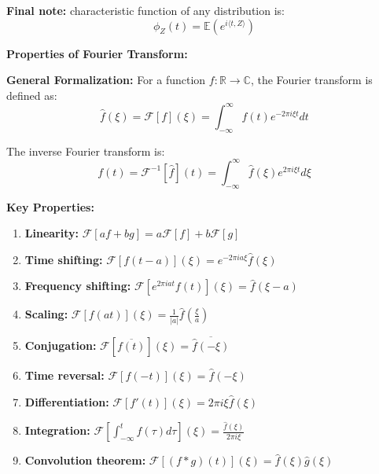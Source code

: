 \documentclass[a4paper, 12pt]{article}
\begin{document}
\begin{answerenum}
        \item \textbf{Final note:} characteristic function of any distribution is:
            \[ \phi_Z(t) = \mathbb{E}(e^{i\langle t,Z\rangle}) \]
            
            \textbf{Properties of Fourier Transform:}

            \textbf{General Formalization:}
            For a function $f: \mathbb{R} \to \mathbb{C}$, the Fourier transform is defined as:
            \[ \hat{f}(\xi) = \mathcal{F}[f](\xi) = \int_{-\infty}^{\infty} f(t) e^{-2\pi i \xi t} dt \]

            The inverse Fourier transform is:
            \[ f(t) = \mathcal{F}^{-1}[\hat{f}](t) = \int_{-\infty}^{\infty} \hat{f}(\xi) e^{2\pi i \xi t} d\xi \]

            \textbf{Key Properties:}
            \begin{enumerate}
                \item \textbf{Linearity:} $\mathcal{F}[af + bg] = a\mathcal{F}[f] + b\mathcal{F}[g]$
                
                \item \textbf{Time shifting:} $\mathcal{F}[f(t-a)](\xi) = e^{-2\pi i a \xi} \hat{f}(\xi)$
                
                \item \textbf{Frequency shifting:} $\mathcal{F}[e^{2\pi i a t} f(t)](\xi) = \hat{f}(\xi - a)$
                
                \item \textbf{Scaling:} $\mathcal{F}[f(at)](\xi) = \frac{1}{|a|} \hat{f}\left(\frac{\xi}{a}\right)$
                
                \item \textbf{Conjugation:} $\mathcal{F}[\overline{f(t)}](\xi) = \overline{\hat{f}(-\xi)}$
                
                \item \textbf{Time reversal:} $\mathcal{F}[f(-t)](\xi) = \hat{f}(-\xi)$
                
                \item \textbf{Differentiation:} $\mathcal{F}[f'(t)](\xi) = 2\pi i \xi \hat{f}(\xi)$
                
                \item \textbf{Integration:} $\mathcal{F}\left[\int_{-\infty}^t f(\tau) d\tau\right](\xi) = \frac{\hat{f}(\xi)}{2\pi i \xi}$
                
                \item \textbf{Convolution theorem:} $\mathcal{F}[(f * g)(t)](\xi) = \hat{f}(\xi) \hat{g}(\xi)$
                

\end{enumerate}
\end{answerenum}
\end{document}
